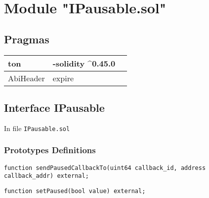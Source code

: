 
\section{Module "IPausable.sol"}


\subsection{Pragmas}


\noindent\begin{tabular}{|l|l|p{5cm}|}\hline
ton & -solidity \^{}0.45.0 &\\\hline
AbiHeader &  expire &\\\hline
\end{tabular}


\subsection{Interface IPausable}


In file {\tt IPausable.sol}

\subsubsection{Prototypes Definitions}

\vspace{2cm}

\begin{lstlisting}[firstnumber=6]
    function sendPausedCallbackTo(uint64 callback_id, address callback_addr) external;
\end{lstlisting}
\vspace{2cm}

\begin{lstlisting}[firstnumber=5]
    function setPaused(bool value) external;
\end{lstlisting}
